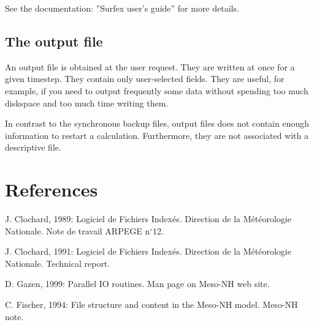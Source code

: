 See the documentation: ''Surfex user's guide'' for more
details.

\subsection{The output file}
An output file is obtained at the user request. They are written at once for a given timestep.
They contain only user-selected fields.
They are useful, for example, if you need to output frequently some data without spending too much diskspace
and too much time writing them.

In contrast to the synchronous backup files, output files does not contain enough information to restart a calculation. Furthermore, they are not associated with a descriptive file.


\section{References}
\decrefname
J. Clochard, 1989: Logiciel de Fichiers Index\'es. Direction de la
 Météorologie Nationale. Note de travail ARPEGE n$^\circ$12.

\decrefname
J. Clochard, 1991: Logiciel de Fichiers Index\'es. Direction de la
 Météorologie Nationale.  Technical report.

\decrefname
D. Gazen, 1999: Parallel IO routines. Man page on Meso-NH web site.

\decrefname
C. Fischer, 1994: File structure and content in the Meso-NH model. Meso-NH note.
